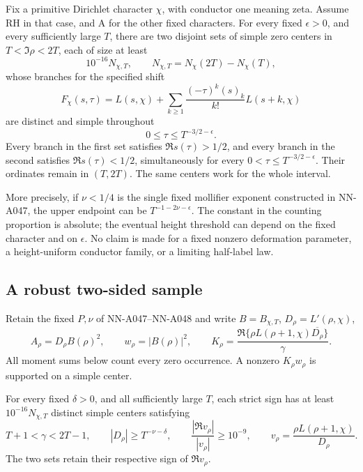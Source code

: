 \begin{theorem}
\label{thm:A049-common-time}
Fix a primitive Dirichlet character \(\chi\), with conductor
one meaning zeta. Assume RH in that case, and A for the other
fixed characters. For every fixed \(\epsilon>0\), and every
sufficiently large \(T\), there are two disjoint sets of
simple zero centers in \(T<\Im\rho<2T\), each of size at least
\[
                         10^{-16}N_{\chi,T},
 \qquad N_{\chi,T}=N_\chi(2T)-N_\chi(T),
\]
whose branches for the specified shift
\begin{equation}\label{eq:A049-shift}
 F_\chi(s,\tau)=L(s,\chi)+
   \sum_{k\ge1}\frac{(-\tau)^k(s)_k}{k!}L(s+k,\chi)
\end{equation}
are distinct and simple throughout
\[
                 0\le\tau\le T^{-3/2-\epsilon}.
\]
Every branch in the first set satisfies
\(\Re s(\tau)>1/2\), and every branch in the second
satisfies \(\Re s(\tau)<1/2\), simultaneously for every
\(0<\tau\le T^{-3/2-\epsilon}\). Their ordinates remain
in \((T,2T)\). The same centers work for the whole interval.

More precisely, if \(\nu<1/4\) is the single fixed mollifier
exponent constructed in NN-A047, the upper endpoint can be
\(T^{-1-2\nu-\epsilon}\). The constant in the counting
proportion is absolute; the eventual height threshold can
depend on the fixed character and on \(\epsilon\).
No claim is made for a fixed nonzero deformation parameter,
a height-uniform conductor family, or a limiting half-label
law.
\end{theorem}

\subsection*{A robust two-sided sample}

Retain the fixed \(P,\nu\) of NN-A047--NN-A048 and write
\(B=B_{\chi,T}\), \(D_\rho=L'(\rho,\chi)\),
\[
 A_\rho=D_\rho B(\rho)^2,\qquad
 w_\rho=|B(\rho)|^2,\qquad
 K_\rho=\frac{\Re\{\rho L(\rho+1,\chi)\overline{D_\rho}\}}
                   {\gamma}.
\]
All moment sums below count every zero occurrence. A nonzero
\(K_\rho w_\rho\) is supported on a simple center.

\begin{lemma}\label{lem:A049-robust}
For every fixed \(\delta>0\), and all sufficiently large \(T\),
each strict sign has at least \(10^{-16}N_{\chi,T}\)
distinct simple centers satisfying
\begin{equation}\label{eq:A049-robust-conditions}
 T+1<\gamma<2T-1,\qquad
 |D_\rho|\ge T^{-\nu-\delta},\qquad
 \frac{|\Re v_\rho|}{|v_\rho|}\ge10^{-9},
 \qquad v_\rho=\frac{\rho L(\rho+1,\chi)}{D_\rho}.
\end{equation}
The two sets retain their respective sign of \(\Re v_\rho\).
\end{lemma}

